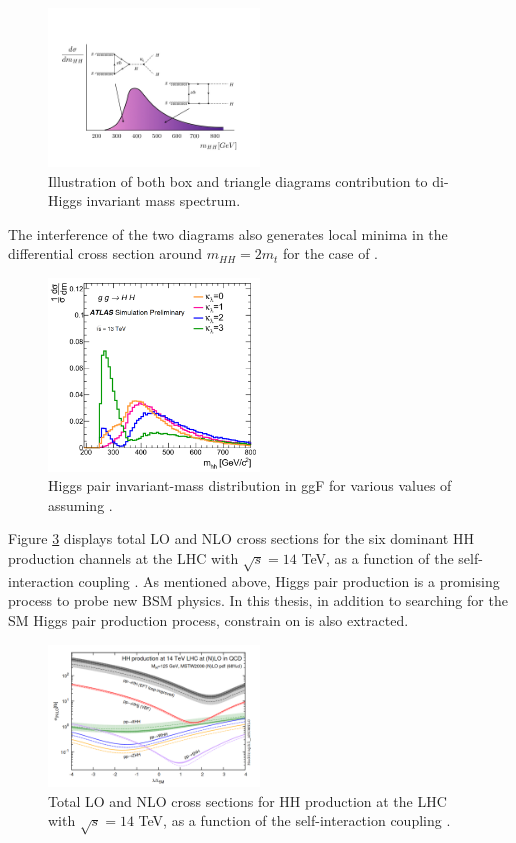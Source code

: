 \begin{figure}[H]
    \centering
    \includegraphics[width=0.5\textwidth]{Ch1/Img/illustration_mHH.jpeg}
    \caption{Illustration of both box and triangle diagrams contribution to di-Higgs invariant mass spectrum.}
    \label{fig:chap1:HH:BSM:I}
\end{figure}
The interference of the two diagrams also generates local minima in the differential cross section around $m_{HH}=2m_t$ for the case of .
\begin{figure}[H]
    \centering
    \includegraphics[width=0.5\textwidth]{Ch1/Img/mHH.png}
    \caption{Higgs pair invariant-mass distribution in ggF for various values of \kl assuming .}
    \label{fig:chap1:HH:BSM:MHH}
\end{figure}

Figure \ref{fig:chap1:HH:BSM:XSEC:L} displays total LO and NLO cross sections for the six dominant HH production channels at the LHC with $\sqrt{s}=14$ TeV, as a function of the self-interaction coupling \kl.  As mentioned above, Higgs pair production is a promising process to probe new BSM physics. In this thesis, in addition to searching for the SM Higgs pair production process, constrain on \kl is also extracted.
\begin{figure}[H]
    \centering
    \includegraphics[width=0.5\textwidth]{Ch1/Img/HH_Xsec_as_lambda.png}
    \caption{Total LO and NLO cross sections for HH production at the LHC with $\sqrt{s}=14$ TeV, as a function of the self-interaction coupling \kl.}
    \label{fig:chap1:HH:BSM:XSEC:L}
\end{figure}

